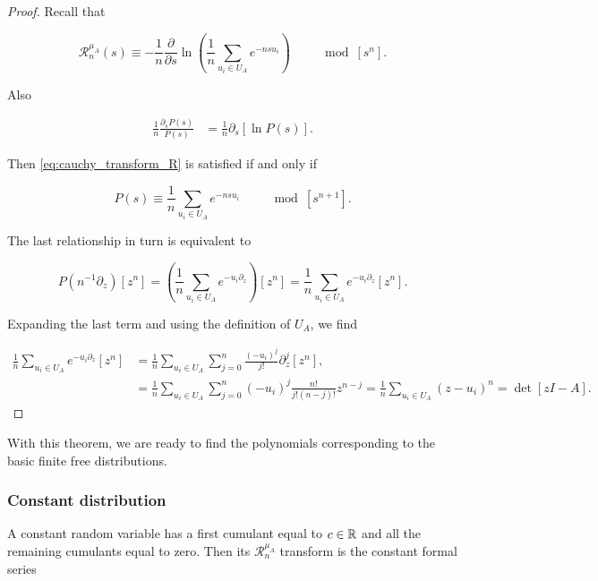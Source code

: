 \begin{proof}
    Recall that

    \begin{equation*}
        \mathcal R_{n}^{\mu_A}(s) \equiv - \frac1n \frac{\partial}{\partial s} \ln \left(\frac1n \sum_{u_i \in U_A} e^{-nsu_i} \right) \qquad \mod [s^n].
    \end{equation*}

    Also 

    \begin{align*}
        \frac1n \frac{\partial_s P(s)}{P(s)} &= \frac1n \partial_s[\ln P(s)].
    \end{align*}

    Then \eqref{eq:cauchy_transform_R} is satisfied if and only if 

    \begin{equation*}
        P(s) \equiv \frac1n \sum_{u_i \in U_A} e^{-nsu_i} \qquad \mod [s^{n+1}].
    \end{equation*}

    The last relationship in turn is equivalent to 

    \begin{equation*}
        P(n^{-1}\partial_z)[z^n] = \left( \frac1n \sum_{u_i \in U_A} e^{-u_i\partial_z} \right)[z^n] = \frac1n \sum_{u_i \in U_A} e^{-u_i\partial_z}[z^n].
    \end{equation*}

    Expanding the last term and using the definition of $U_A$, we find

    \begin{align*}
        \frac1n \sum_{u_i \in U_A} e^{-u_i\partial_z}[z^n] &=  \frac1n \sum_{u_i \in U_A} \sum_{j=0}^n \frac{(-u_i)^j}{j!} \partial_z^j[z^n],\\
        &= \frac1n \sum_{u_i \in U_A} \sum_{j=0}^n (-u_i)^j \frac{n!}{j!(n-j)!}z^{n-j} = \frac1n \sum_{u_i \in U_A} (z - u_i)^n = \det[zI - A].
    \end{align*}\end{proof}

    With this theorem, we are ready to find the polynomials corresponding to the basic finite free distributions.

\subsubsection{Constant distribution}

A constant random variable has a first cumulant equal to $c \in \mathbb R$ and all the remaining cumulants equal to zero. Then its $\mathcal R_n^{\mu_A}$ transform is the constant formal series

